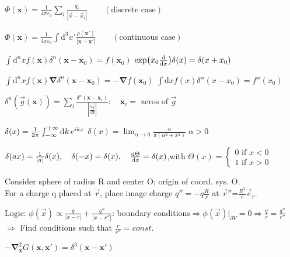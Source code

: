 \item $\Phi(\boldsymbol{x}) = \frac{1}{4\pi \varepsilon_0} \sum_{i} \frac{q_i}{|\vec{x}-\vec{x}_i|} \qquad (\text{discrete case})$

\item $\Phi(\boldsymbol{x}) = \frac{1}{4\pi \varepsilon_0} \int \text{d}^3x' \frac{\rho(\boldsymbol{x}')}{|\boldsymbol{x}-\boldsymbol{x}'|} \qquad (\text{continuous case})$
\squishend

\squishlist
\item $\int \text{d}^nx f(\boldsymbol{x})\delta^n(\boldsymbol{x}-\boldsymbol{x}_0)= f(\boldsymbol{x}_0)$ \squishsep $\exp(x_0 \frac{\textrm{d} }{\textrm{d} x})\delta(x) = \delta(x+x_0)$

\item $\int \text{d}^nx f(\boldsymbol{x})\boldsymbol{\nabla}\delta^n(\boldsymbol{x}-\boldsymbol{x}_0)= - \boldsymbol{\nabla}f(\boldsymbol{x}_0)$ \squishsep $\int \text{d}x f(x)\delta''(x-x_0)= f''(x_0)$

\item $\delta^n(\vec{g}(\boldsymbol{x})) = \sum_i \frac{\delta^n(\boldsymbol{x}-\boldsymbol{x}_i)}{\left|\frac{\partial \vec{g}}{\partial \boldsymbol{x}} \right|} : \quad \boldsymbol{x}_i = \text{ zeros of }\vec{g}$

\item $\delta(x) = \frac{1}{2\pi} \int_{-\infty}^{+\infty}\textrm{d} k \, e^{ikx}$ \squishsep $\delta(x) = \lim_{\alpha\rightarrow0}\frac{\alpha}{\pi(\alpha^2 + x^2)}\; \alpha>0$

\item $\delta(ax) = \frac{1}{|a|} \delta(x), \quad \delta(-x) = \delta(x), \quad \frac{\textrm{d} \Theta}{\textrm{d} x} = \delta(x)$,\quad with $\Theta(x)=\begin{cases}0 \text{ if } x<0\\1 \text{ if } x>0\end{cases}$
\squishend


\squishlist
\item Consider sphere of radius R and center O; origin of coord. sys. O.\\
For a charge q placed at $\vec{r}$, place image charge $q''=-q\frac{R}{r}$ at $\vec{r}''$=$\frac{R^2}{r}\vec{e}_r$.
\item Logic: 
$\phi(\vec{x})\propto\frac{q}{|x-r|}+\frac{q''}{|x-r''|}$: boundary conditions$\Rightarrow\phi(\vec{x})|_{\partial V}=0\Rightarrow\frac{q}{r}=\frac{q''}{r''}$\\
$\Rightarrow$ Find conditions such that $\frac{r}{r''}=const$.\\
\squishend
\vspace{5cm}
\squishlist
\item $-\boldsymbol{\nabla}_{\boldsymbol{x}}^2 G(\boldsymbol{x}, \boldsymbol{x}') = \delta^3(\boldsymbol{x}-\boldsymbol{x}')$

